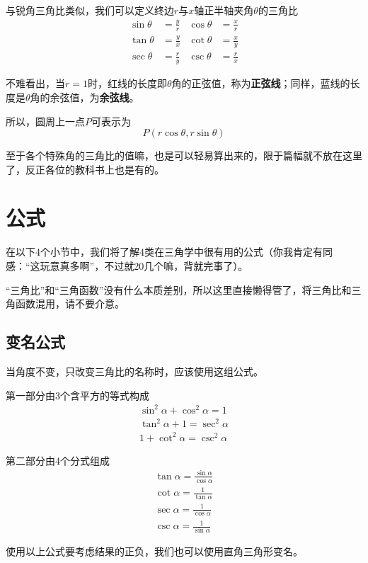 与锐角三角比类似，我们可以定义终边$r$与$x$轴正半轴夹角$\theta$的三角比
\begin{align*}
    \sin\theta&=\frac{y}{r} & \cos\theta&=\frac{x}{r} \\
    \tan\theta&=\frac{y}{x} & \cot\theta&=\frac{x}{y} \\
    \sec\theta&=\frac{r}{y} & \csc\theta&=\frac{r}{x}
\end{align*}

不难看出，当$r=1$时，红线的长度即$\theta$角的正弦值，称为\textbf{正弦线}；同样，蓝线的长度是$\theta$角的余弦值，为\textbf{余弦线}。

所以，圆周上一点$P$可表示为\[P(r\cos\theta,r\sin\theta)\]

至于各个特殊角的三角比的值嘛，也是可以轻易算出来的，限于篇幅就不放在这里了，反正各位的教科书上也是有的。

\section{公式}
在以下4个小节中，我们将了解4类在三角学中很有用的公式（你我肯定有同感：“这玩意真多啊”，不过就20几个嘛，背就完事了）。

“三角比”和“三角函数”没有什么本质差别，所以这里直接懒得管了，将三角比和三角函数混用，请不要介意。

\subsection{变名公式}
当角度不变，只改变三角比的名称时，应该使用这组公式。

第一部分由3个含平方的等式构成
\begin{gather}
	\sin^2\alpha+\cos^2\alpha=1 \label{equ:trig-1} \\
	\tan^2\alpha+1=\sec^2\alpha \label{equ:trig-2}\\
	1+\cot^2\alpha=\csc^2\alpha \label{equ:trig-3}
\end{gather}

第二部分由4个分式组成
\begin{gather}
	\tan\alpha=\frac{\sin\alpha}{\cos\alpha} \label{equ:trig-4} \\
	\cot\alpha=\frac{1}{\tan\alpha} \label{equ:trig-5} \\
	\sec\alpha=\frac{1}{\cos\alpha} \label{equ:trig-6} \\
	\csc\alpha=\frac{1}{\sin\alpha} \label{equ:trig-7}
\end{gather}

使用以上公式要考虑结果的正负，我们也可以使用直角三角形变名。

